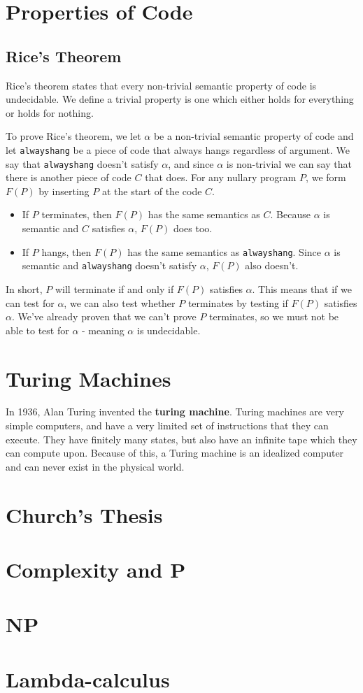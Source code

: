 \documentclass[11pt]{article}
\begin{document}
	\section{Properties of Code}
	
	\subsection{Rice's Theorem}
	Rice's theorem states that every non-trivial semantic property of code is undecidable. We define a trivial property is one which either holds for everything or holds for nothing.
	\par 
	To prove Rice's theorem, we let $\alpha$ be a non-trivial semantic property of code and let \texttt{alwayshang} be a piece of code that always hangs regardless of argument. We say that \texttt{alwayshang} doesn't satisfy $\alpha$, and since $\alpha$ is non-trivial we can say that there is another piece of code $C$ that does. For any nullary program $P$, we form $F(P)$ by inserting $P$ at the start of the code $C$.
	\begin{itemize}
		\item If $P$ terminates, then $F(P)$ has the same semantics as $C$. Because $\alpha$ is semantic and $C$ satisfies $\alpha$, $F(P)$ does too.
		\item If $P$ hangs, then $F(P)$ has the same semantics as \texttt{alwayshang}. Since $\alpha$ is semantic and \texttt{alwayshang} doesn't satisfy $\alpha$, $F(P)$ also doesn't.
	\end{itemize}
	
	In short, $P$ will terminate if and only if $F(P)$ satisfies $\alpha$. This means that if we can test for $\alpha$, we can also test whether $P$ terminates by testing if $F(P)$ satisfies $\alpha$. We've already proven that we can't prove $P$ terminates, so we must not be able to test for $\alpha$ - meaning $\alpha$ is undecidable.
	
	\section{Turing Machines}
	In 1936, Alan Turing invented the \textbf{turing machine}. Turing machines are very simple computers, and have a very limited set of instructions that they can execute. They have finitely many states, but also have an infinite tape which they can compute upon. Because of this, a Turing machine is an idealized computer and can never exist in the physical world.
	
	\section{Church's Thesis}
	
	\section{Complexity and P}
	
	\section{NP}
	
	\section{Lambda-calculus}
	
	\newpage
	\listoffigures
	\printindex
\end{document}
